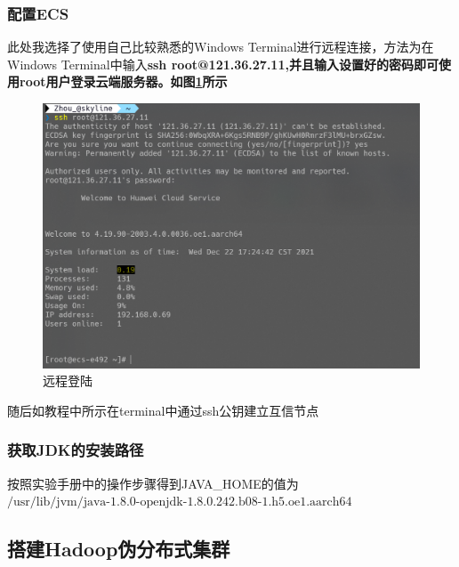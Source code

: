 \documentclass{../source/zjureport}
\begin{document}
            \subsubsection{配置ECS}
                此处我选择了使用自己比较熟悉的Windows Terminal进行远程连接，方法为在Windows Terminal中输入\bf{ssh root@121.36.27.11},并且输入设置好的密码即可使用root用户登录云端服务器。如图\ref{远程连接}所示
                \begin{figure}[H]
                    \centering
                    \includegraphics[width = \textwidth]{figure/远程登陆.png}
                    \caption{远程登陆}
                    \label{远程连接}
                \end{figure}

                随后如教程中所示在terminal中通过ssh公钥建立互信节点

            \subsubsection{获取JDK的安装路径}
                按照实验手册中的操作步骤得到JAVA_HOME的值为$\text{/usr/lib/jvm/java-1.8.0-openjdk-1.8.0.242.b08-1.h5.oe1.aarch64}$

        \subsection{搭建Hadoop伪分布式集群}
\end{document}
